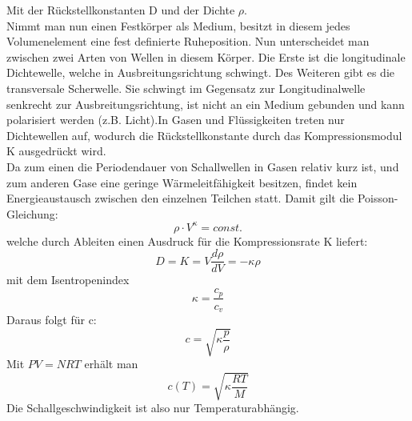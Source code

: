 \documentclass{article}
\begin{document}
{Mit der Rückstellkonstanten D und der Dichte \(\rho\).\\
Nimmt man nun einen Festkörper als Medium, besitzt in diesem jedes Volumenelement eine fest definierte Ruheposition. Nun unterscheidet man zwischen zwei Arten von Wellen in diesem Körper. Die Erste ist die longitudinale Dichtewelle, welche in Ausbreitungsrichtung schwingt. Des Weiteren gibt es die transversale Scherwelle. Sie schwingt im Gegensatz zur Longitudinalwelle senkrecht zur Ausbreitungsrichtung, ist nicht an ein Medium gebunden und kann polarisiert werden (z.B. Licht).In Gasen und Flüssigkeiten treten nur Dichtewellen auf, wodurch die Rückstellkonstante durch das Kompressionsmodul K ausgedrückt wird.\\
Da zum einen die Periodendauer von Schallwellen in Gasen relativ kurz ist, und zum anderen Gase eine geringe Wärmeleitfähigkeit besitzen, findet kein Energieaustausch zwischen den einzelnen Teilchen statt. Damit gilt die Poisson-Gleichung:
\begin{equation}
\label{rho}
\rho \cdot V^{\kappa} = const.
\end{equation}
welche durch Ableiten einen Ausdruck für die Kompressionsrate K liefert:
\begin{equation}
\label{K}
D = K = V \frac{d\rho}{dV}=-\kappa \rho
\end{equation}
mit dem Isentropenindex 
\begin{equation}
\label{kappa}
\kappa = \frac{c_{p}}{c_{v}}
\end{equation}
Daraus folgt für c:
\begin{equation}
c=\sqrt{\kappa\frac{p}{\rho}}
\end{equation}
Mit \(PV = NRT\) erhält man
\begin{equation}
c(T) = \sqrt{\kappa\frac{RT}{M}} \label{c(T)}
\end{equation}
Die Schallgeschwindigkeit ist also nur Temperaturabhängig.

\newpage
}
\end{document}
